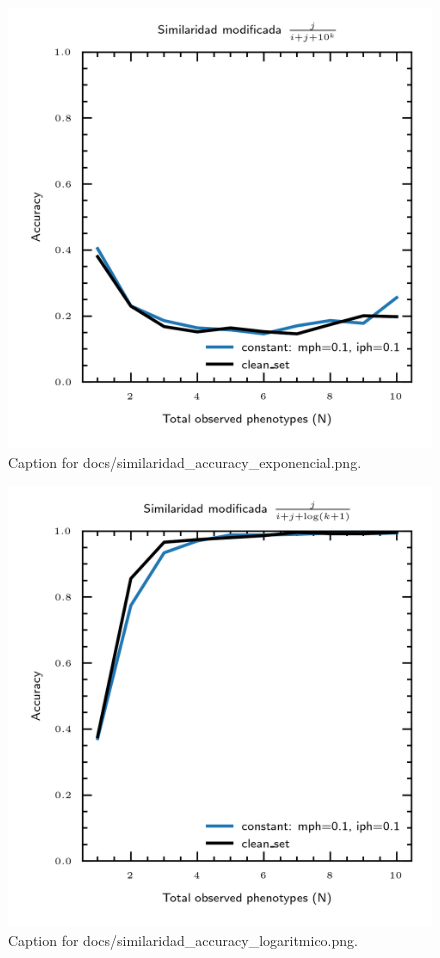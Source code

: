 \documentclass{article}
\begin{document}
\begin{figure}[h] \centering \includegraphics{docs/similaridad_accuracy_exponencial.png} \caption{Caption for docs/similaridad_accuracy_exponencial.png.} \end{figure}
\begin{figure}[h] \centering \includegraphics{docs/similaridad_accuracy_logaritmico.png} \caption{Caption for docs/similaridad_accuracy_logaritmico.png.} \end{figure}
\end{document}
